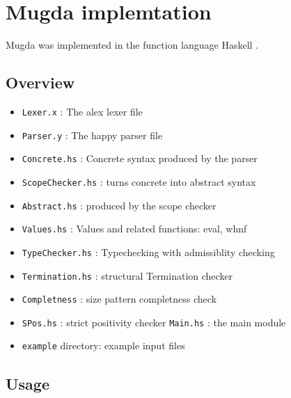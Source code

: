 \appendix
\chapter{Mugda implemtation}
Mugda was implemented in the function language Haskell \cite{haskell}.
\section{Overview}
\begin{itemize}
\item
\texttt{Lexer.x} : The alex lexer file
\item
\texttt{Parser.y} : The happy parser file
\item
\texttt{Concrete.hs} : Concrete syntax produced by the parser
\item
\texttt{ScopeChecker.hs} : turns concrete into abstract syntax
\item
\texttt{Abstract.hs} : produced by the scope checker
\item
\texttt{Values.hs} : Values and related functions: eval, whnf 
\item
\texttt{TypeChecker.hs} : Typechecking with admissiblity checking
\item
\texttt{Termination.hs} : structural Termination checker
\item
\texttt{Completness} : size pattern completness check
\item
\texttt{SPos.hs} : strict positivity checker
\texttt{Main.hs} : the main module
\item
\texttt{example} directory: example input files
\end{itemize}

\section{Usage}

